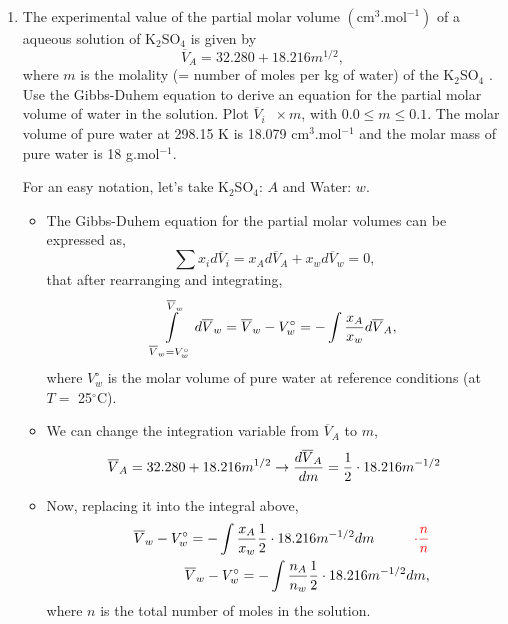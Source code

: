 \begin{enumerate}[1)]
   \item\label{Mod05Ex05} The experimental value of the partial molar volume $\left(\text{cm}^{3}\text{.mol}^{-1}\right)$ of a aqueous solution of K$_{2}$SO$_{4}$ is given by
                \begin{displaymath}
                   \overline{V}_{A} = 32.280 + 18.216 m^{1/2},
                \end{displaymath} 
 where $m$ is the molality (= number of moles per kg of water) of the K$_{2}$SO$_{4}$ . Use the Gibbs-Duhem equation to derive an equation for the partial molar volume of water in the solution. Plot $\overline{V}_{i}\;\;\times m$, with $0.0\leq m\leq 0.1$. The molar volume of pure water at 298.15 K is 18.079 cm$^{3}$.mol$^{-1}$ and the molar mass of pure water is 18 g.mol$^{-1}$.

        For an easy notation, let's take K$_{2}$SO$_{4}$: $A$ and Water: $w$.
\begin{itemize}
  \item The Gibbs-Duhem equation for the partial molar volumes can be expressed as,
     \begin{displaymath}
        \sum\limits x_{i}d\overline{V}_{i} = x_{A} d\overline{V}_{A} + x_{w} d\overline{V}_{w} = 0,
     \end{displaymath}
     that after rearranging and integrating,
     \begin{displaymath}
        \int\limits_{\overline{V}_{w}=V_{w}^{\circ}}^{\overline{V}_{w}}d\overline{V}_{w} = \overline{V}_{w} - V_{w}^{\circ} = -\int\displaystyle\frac{x_{A}}{x_{w}} d\overline{V}_{A},
     \end{displaymath}
     where $V_{w}^{\circ}$ is the molar volume of pure water at reference conditions (\ie at $T=$ 25$^{\circ}$C).

  \item We can change the integration variable from $\overline{V}_{A}$ to $m$,
      \begin{displaymath}
         \overline{V}_{A} = 32.280 + 18.216 m^{1/2} \rightarrow \displaystyle\frac{d\overline{V}_{A}}{dm} = \displaystyle\frac{1}{2}\cdot 18.216 m^{-1/2} 
      \end{displaymath} 
  
  \item Now, replacing it into the integral above,
       \begin{eqnarray}
          && \overline{V}_{w} - V_{w}^{\circ} = -\int\displaystyle\frac{x_{A}}{x_{w}} \displaystyle\frac{1}{2}\cdot 18.216 m^{-1/2} dm \hspace{1cm} \textcolor{red}{\cdot\displaystyle\frac{n}{n}} \nonumber \\
          && \overline{V}_{w} - V_{w}^{\circ} = -\int\displaystyle\frac{n_{A}}{n_{w}} \displaystyle\frac{1}{2}\cdot 18.216 m^{-1/2} dm, \nonumber
       \end{eqnarray}
       where $n$ is the total number of moles in the solution.


\end{itemize}
\end{enumerate}
